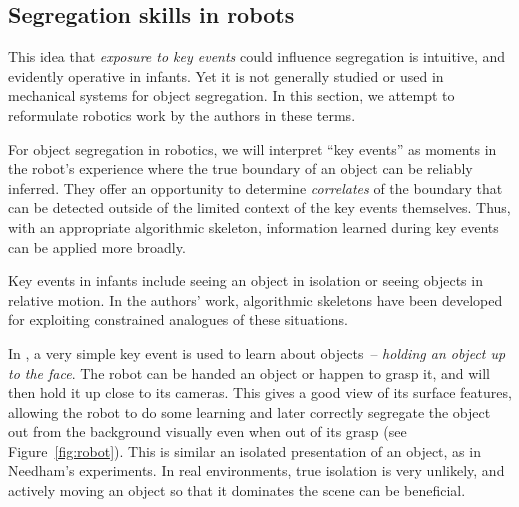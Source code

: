 %



\subsection{Segregation skills in robots}



This idea that {\em exposure to key events} could influence
segregation is intuitive, and evidently operative in infants.  Yet it
is not generally studied or used in mechanical systems for object
segregation.  In this section, we attempt to reformulate robotics
work by the authors in these terms.

For object segregation in robotics, we will interpret ``key events''
as moments in the robot's experience where the true boundary of an
object can be reliably inferred.  They offer an opportunity to
determine {\em correlates} of the boundary that can be detected
outside of the limited context of the key events themselves.  Thus,
with an appropriate algorithmic skeleton, information learned during
key events can be applied more broadly.

Key events in infants include seeing an object in isolation
or seeing objects in relative motion.  In the authors' work,
 algorithmic skeletons have been developed for exploiting
constrained analogues of these situations.

%
In , a very simple key event is used to
learn about objects~-- {\em holding an object up to the face}.
%
The robot can be
 handed an object or happen to grasp it, 
and will then hold it up close to its cameras.
This gives a good view of its surface features, allowing the robot to
do some learning and later correctly segregate the object
out from the background  visually even when out of its
grasp (see Figure~\ref{fig:robot}).
%
%
This is similar an isolated presentation of an object, as in
Needham's experiments.  In real
environments, true isolation is very unlikely, and actively
moving an object so that it dominates the scene can be
beneficial.



